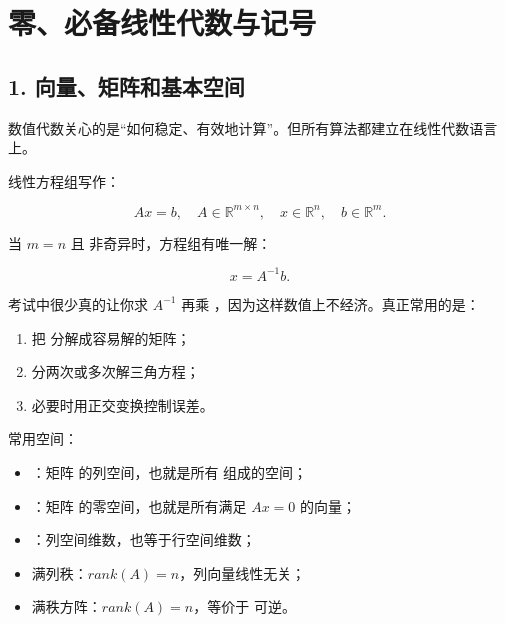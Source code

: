 \documentclass[11pt,a4paper]{ctexart}
\newcommand{\code}[1]{\begingroup\ttfamily\small #1\endgroup}
\begin{document}

\section*{零、必备线性代数与记号}



\subsection*{1. 向量、矩阵和基本空间}


数值代数关心的是“如何稳定、有效地计算”。但所有算法都建立在线性代数语言上。

线性方程组写作：

\[
Ax=b,\quad A\in\mathbb R^{m\times n},\quad x\in\mathbb R^n,\quad b\in\mathbb R^m.
\]

当 $m=n$ 且 \code{} 非奇异时，方程组有唯一解：

\[
x=A^{-1}b.
\]

考试中很少真的让你求 $A^{-1}$ 再乘 \code{}，因为这样数值上不经济。真正常用的是：

\begin{enumerate}

\item 把 \code{} 分解成容易解的矩阵；

\item 分两次或多次解三角方程；

\item 必要时用正交变换控制误差。

\end{enumerate}

常用空间：

\begin{itemize}

\item \code{}：矩阵 \code{} 的列空间，也就是所有 \code{} 组成的空间；

\item \code{}：矩阵 \code{} 的零空间，也就是所有满足 $Ax=0$ 的向量；

\item \code{}：列空间维数，也等于行空间维数；

\item \code{} 满列秩：$rank(A)=n$，列向量线性无关；

\item \code{} 满秩方阵：$rank(A)=n$，等价于 \code{} 可逆。

\end{itemize}
\end{document}
